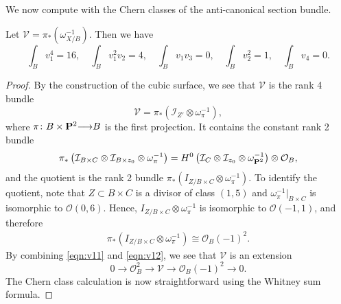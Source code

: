 \documentclass[reqno]{amsart}
\renewcommand{\to}{{\longrightarrow}}
\renewcommand {\P}{{\bf P}}
\numberwithin{equation}{section}
\renewcommand{\O}{\mathcal{O}}
\begin{document}
We now compute with the Chern classes of the anti-canonical section bundle.
\begin{proposition}\label{lem:v1}
  Let $\mathcal{V} = \pi_* \left( \omega_{X/B}^{-1} \right)$.
  Then we have
  \[
    \int_{B}v_{1}^{4} = 16, \quad \int_{B}v_{1}^{2}v_{2} = 4,\quad \int_{B}v_{1}v_{3} =0,\quad \int_{B}v_2^{2} = 1,\quad \int_{B}v_{4} = 0.\]
\end{proposition}
\begin{proof}
By the construction of the cubic surface, we see that $\mathcal{V}$ is the rank 4 bundle
\[ \mathcal{V} = \pi_* (\mathcal{I}_{Z'} \otimes \omega_{\pi}^{-1}),\]
where $\pi \colon B \times \P^2 \to B$ is the first projection.
It contains the constant rank 2 bundle
\begin{equation}\label{eqn:v11}
  \pi_*\left( \mathcal{I}_{B \times C} \otimes \mathcal{I}_{B \times z_0} \otimes \omega_{\pi}^{-1} \right) = H^0\left(\mathcal{I}_{C} \otimes \mathcal{I}_{z_0} \otimes \omega_{\P^2}^{-1}\right) \otimes \O_{B},
\end{equation}
and the quotient is the rank 2 bundle $\pi_*\left( I_{Z/B \times C} \otimes \omega_{\pi}^{-1} \right)$.
To identify the quotient, note that $Z \subset B \times C$ is a divisor of class $(1,5)$ and $\omega^{-1}_{\pi}|_{B\times C}$ is isomorphic to $\O(0,6)$.
Hence, $I_{Z/B \times C} \otimes \omega_{\pi}^{-1}$ is isomorphic to $\O(-1,1)$, and therefore
\begin{equation}\label{eqn:v12}
  \begin{split}
    \pi_*\left( I_{Z/B \times C} \otimes \omega_{\pi}^{-1} \right) \cong \O_{B}(-1)^{2}.
  \end{split}
\end{equation}
By combining \eqref{eqn:v11} and \eqref{eqn:v12}, we see that $\mathcal{V}$ is an extension
\begin{equation}\label{eqn:V1}
  0 \to \O_{B}^2 \to \mathcal{V} \to \O_{B}(-1)^2 \to 0.
\end{equation}
The Chern class calculation is now straightforward using the Whitney sum formula.
\end{proof}
\end{document}
